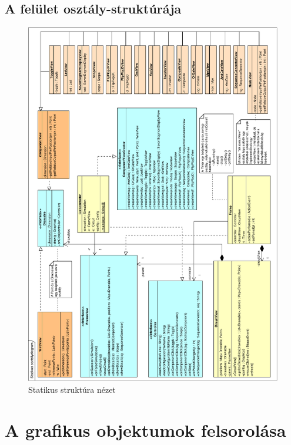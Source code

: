 \subsection{A felület osztály-struktúrája}

\begin{figure}[H]
\begin{center}
\includegraphics*[width=17cm]{chapters/chapter11/pdfs/class.pdf}
\caption{Statikus struktúra nézet}
\label{fig:class_diagram}
\end{center}
\end{figure}

\section{A grafikus objektumok felsorolása}









